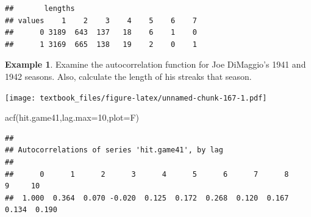 \documentclass[
  11pt,
]{book}
\newenvironment{Shaded}{\begin{snugshade}}{\end{snugshade}}
\newcommand{\AttributeTok}[1]{\textcolor[rgb]{0.77,0.63,0.00}{#1}}
\newcommand{\CommentTok}[1]{\textcolor[rgb]{0.56,0.35,0.01}{\textit{#1}}}
\newcommand{\ConstantTok}[1]{\textcolor[rgb]{0.00,0.00,0.00}{#1}}
\newcommand{\DecValTok}[1]{\textcolor[rgb]{0.00,0.00,0.81}{#1}}
\newcommand{\FunctionTok}[1]{\textcolor[rgb]{0.00,0.00,0.00}{#1}}
\newcommand{\NormalTok}[1]{#1}
\newcommand{\OtherTok}[1]{\textcolor[rgb]{0.56,0.35,0.01}{#1}}
\newcommand{\SpecialCharTok}[1]{\textcolor[rgb]{0.00,0.00,0.00}{#1}}
\newcommand{\StringTok}[1]{\textcolor[rgb]{0.31,0.60,0.02}{#1}}
\theoremstyle{definition}
\theoremstyle{definition}
\newtheorem{example}{Example}[chapter]
\theoremstyle{definition}
\theoremstyle{definition}
\theoremstyle{remark}
\begin{document}
\begin{verbatim}
##       lengths
## values    1    2    3    4    5    6    7
##      0 3189  643  137   18    6    1    0
##      1 3169  665  138   19    2    0    1
\end{verbatim}

\newpage

\begin{example}
Examine the autocorrelation function for Joe DiMaggio's 1941 and 1942 seasons. Also, calculate the length of his streaks that season.
\end{example}

\begin{Shaded}
\end{Shaded}

\texttt{[image: textbook\_files/figure-latex/unnamed-chunk-167-1.pdf]}

\begin{Shaded}
\begin{Highlighting}[]
\FunctionTok{acf}\NormalTok{(hit.game41,}\AttributeTok{lag.max=}\DecValTok{10}\NormalTok{,}\AttributeTok{plot=}\NormalTok{F)}
\end{Highlighting}
\end{Shaded}

\begin{verbatim}
## 
## Autocorrelations of series 'hit.game41', by lag
## 
##      0      1      2      3      4      5      6      7      8      9     10 
##  1.000  0.364  0.070 -0.020  0.125  0.172  0.268  0.120  0.167  0.134  0.190
\end{verbatim}
\end{document}
